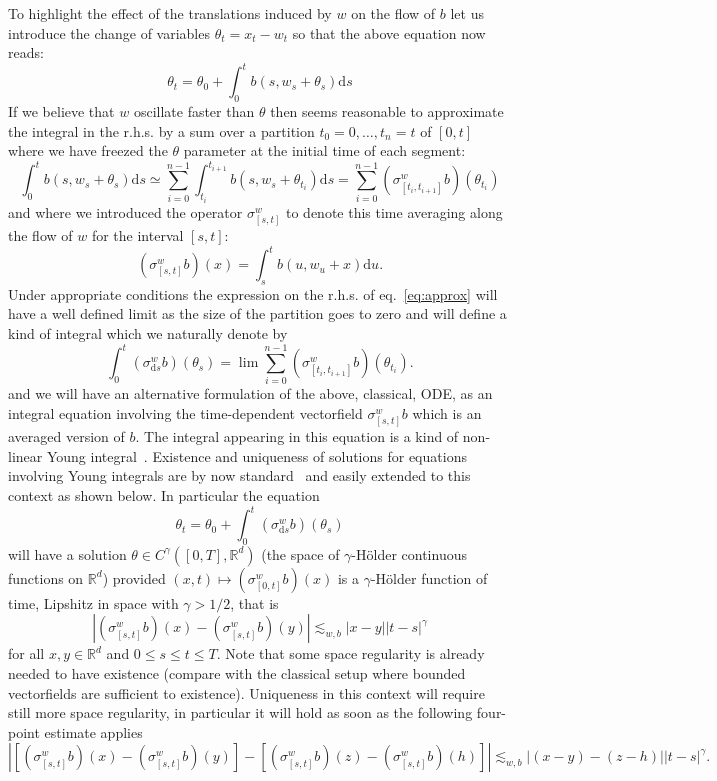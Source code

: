 \documentclass[11pt,a4paper,draft,reqno]{amsart}
\theoremstyle{definition}
\newcommand{\RR}{\mathbb{R}}
\newcommand{\dd}{\mathrm{d}}
\begin{document}
To highlight the effect of the translations induced by $w$ on the flow of $b$ let us introduce the change of variables $\theta_t = x_t - w_t$ so that the above equation now reads:
\begin{equation*}
\theta_t=\theta_0 + \int_0^t b(s,w_s+\theta_s)\dd s 
\end{equation*}
If we believe that $w$ oscillate faster than $\theta$ then seems reasonable to approximate the integral in the r.h.s. by a sum over a partition $t_0=0,\dots,t_n=t$ of $[0,t]$ where we have freezed the $\theta$ parameter at the initial time of each  segment:
\begin{equation}
\label{eq:approx}
 \int_0^t b(s,w_s+\theta_s)\dd s \simeq \sum_{i=0}^{n-1} \int_{t_{i}}^{t_{i+1}} b(s,w_s+\theta_{t_i})\dd s = \sum_{i=0}^{n-1} (\sigma^w_{[t_i,t_{i+1}]} b )(\theta_{t_i})
\end{equation}
and where we introduced the operator $\sigma^w_{[s,t]}$ to denote this time averaging along the flow of $w$ for the interval $[s,t]$:
\begin{equation*}
(\sigma^w_{[s,t]} b) (x)= \int_{s}^{t} b(u,w_u+x)\dd u .
\end{equation*}
Under appropriate conditions the expression on the r.h.s. of eq.~\eqref{eq:approx} will have a well defined limit as the size of the partition goes to zero and will define a kind of integral which we naturally denote by
\begin{equation*}
\int_0^t (\sigma^w_{\dd s}b)(\theta_s) = \lim \sum_{i=0}^{n-1} (\sigma^w_{[t_i,t_{i+1}]} b )(\theta_{t_i}).
\end{equation*}
and we will have an alternative formulation of the above, classical, ODE, as an integral equation involving the time-dependent vectorfield $\sigma^w_{[s,t]}b$ which is an averaged version of $b$. The integral appearing in this equation is a kind of non-linear Young integral~\cite{Young}.
Existence and uniqueness of solutions for equations involving Young integrals are by now standard~\cites{Lyons,Controlling,FV} and easily extended to this context as shown below. In particular the equation
\begin{equation*}
\theta_t = \theta_0 + \int_0^t (\sigma^w_{\dd s}b)(\theta_s)
\end{equation*}
will have a solution $\theta\in C^\gamma([0,T],\RR^d)$ (the space of $\gamma$-H\"older continuous functions on $\RR^d$) provided $(x,t)\mapsto (\sigma^w_{[0,t]}b)(x)$ is a $\gamma$-H\"older function of time, Lipshitz in space with $\gamma>1/2$, that is
$$
|(\sigma^w_{[s,t]}b)(x)-(\sigma^w_{[s,t]}b)(y)| \lesssim_{w,b} |x-y| |t-s|^\gamma
$$ 
for all $x,y\in\RR^d$ and $0\le s \le t \le T$. 
Note that some space regularity is already needed to have existence (compare with the classical setup where bounded vectorfields are sufficient to existence). Uniqueness in this context will require still more space regularity, in particular it will hold as soon as the following four-point estimate applies
$$
|[(\sigma^w_{[s,t]}b)(x)-(\sigma^w_{[s,t]}b)(y)]-[(\sigma^w_{[s,t]}b)(z)-(\sigma^w_{[s,t]}b)(h)]| \lesssim_{w,b} |(x-y)-(z-h)| |t-s|^\gamma .
$$ 
\end{document}

